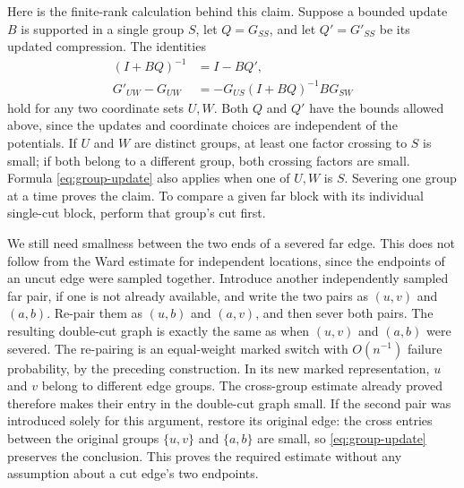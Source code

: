 Here is the finite-rank calculation behind this claim.  Suppose a
bounded update $B$ is supported in a single group $S$, let
$Q=G_{SS}$, and let $Q'=G'_{SS}$ be its updated compression.  The
identities
\begin{equation}\label{eq:group-update}
 \begin{split}
 (I+BQ)^{-1}&=I-BQ',\\
 G'_{UW}-G_{UW}&=-G_{US}(I+BQ)^{-1}B G_{SW}
 \end{split}
\end{equation}
hold for any two coordinate sets $U,W$.  Both $Q$ and $Q'$ have the
bounds allowed above, since the updates and coordinate choices are
independent of the potentials.  If $U$ and $W$ are distinct groups,
at least one factor crossing to $S$ is small; if both belong to a
different group, both crossing factors are small.  Formula
\eqref{eq:group-update} also applies when one of $U,W$ is $S$.
Severing one group at a time proves the claim.  To compare a given
far block with its individual single-cut block, perform that group's
cut first.

We still need smallness between the two ends of a severed far edge.
This does not follow from the Ward estimate for independent locations,
since the endpoints of an uncut edge were sampled together.  Introduce
another independently sampled far pair, if one is not already available,
and write the two pairs as $(u,v)$ and $(a,b)$.  Re-pair them as
$(u,b)$ and $(a,v)$, and then sever both pairs.  The resulting double-cut
graph is exactly the same as when $(u,v)$ and $(a,b)$ were severed.
The re-pairing is an equal-weight marked switch with $O(n^{-1})$
failure probability, by the preceding construction.  In its new marked
representation, $u$ and $v$ belong to different edge groups.  The
cross-group estimate already proved therefore makes their entry in
the double-cut graph small.  If the second pair was introduced solely
for this argument, restore its original edge: the cross entries
between the original groups $\{u,v\}$ and $\{a,b\}$ are small, so \eqref{eq:group-update} preserves the
conclusion.  This proves the required estimate without any assumption
about a cut edge's two endpoints.

